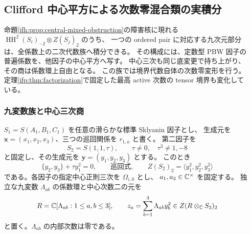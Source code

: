 \subsection{Clifford 中心平方による次数零混合類の実積分}
\label{ifc:subsec:clifford-family}

命題\ref{ifh:prop:central-mixed-obstruction}の障害核に現れる
$\operatorname{HH}^2(S_i)_{-2}\otimes Z(S_j)_2$ のうち、
一つの ordered pair に対応する九次元部分は、全係数上の二次代数族へ積分できる。
その構成には、定数型 PBW 因子の普遍係数を、他因子の中心平方へ写す。
中心三次も同じ底変更で持ち上がり、その商は係数環上自由となる。
この族では境界代数自体の次数零変形を行う。
定理\ref{ifp:thm:factorization}で固定した最高 active 次数の tensor 境界も変化している。

\subsubsection{九変数族と中心三次商}

$S_1=S(A_1,B_1,C_1)$ を任意の滑らかな標準 Sklyanin 因子とし、
生成元を $\mathbf x=(x_1,x_2,x_3)$、三つの巡回関係を $r_{1,a}$ と書く。
第二因子を
\[
 S_2=S(1,1,\tau),\qquad
 \tau\ne0,\quad \tau^3\ne1,-8
\]
と固定し、その生成元を $\mathbf y=(y_1,y_2,y_3)$ とする。
このとき
\[
 \{y_2,y_3\}+\tau y_1^2=0,\qquad\text{巡回式},\qquad
 Z(S_2)_2=\langle y_1^2,y_2^2,y_3^2\rangle
\]
である。各因子の指定中心正則三次を $\Omega_{i,0}$ とし、
$a_1,a_2\in\mathbb C^\times$ を固定する。
独立な九変数 $\Lambda_{ab}$ の係数環と中心次数二の元を
\begin{equation}\label{ifc:eq:parameters}
 R=\mathbb C[\Lambda_{ab}:1\le a,b\le3],\qquad
 z_a=\sum_{b=1}^3\Lambda_{ab}y_b^2\in Z(R\otimes_\mathbb C S_2)_2
\end{equation}
と置く。$\Lambda_{ab}$ の内部次数は零である。

